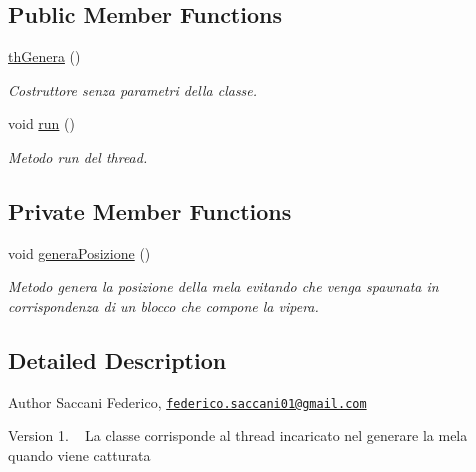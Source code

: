 \subsection*{Public Member Functions}
\begin{DoxyCompactItemize}
\item 
\mbox{\hyperlink{class_snake_1_1game_1_1threads_1_1th_genera_a0852ddb3ed4a55dcae45599d6ae3ebca}{th\+Genera}} ()
\begin{DoxyCompactList}\small\item\em Costruttore senza parametri della classe. \end{DoxyCompactList}\item 
void \mbox{\hyperlink{class_snake_1_1game_1_1threads_1_1th_genera_a13a43e6d814de94978c515cb084873b1}{run}} ()
\begin{DoxyCompactList}\small\item\em Metodo run del thread. \end{DoxyCompactList}\end{DoxyCompactItemize}
\subsection*{Private Member Functions}
\begin{DoxyCompactItemize}
\item 
void \mbox{\hyperlink{class_snake_1_1game_1_1threads_1_1th_genera_a3d74cc6ca0a52476e34eefbf570fa492}{genera\+Posizione}} ()
\begin{DoxyCompactList}\small\item\em Metodo genera la posizione della mela evitando che venga spawnata in corrispondenza di un blocco che compone la vipera. \end{DoxyCompactList}\end{DoxyCompactItemize}


\subsection{Detailed Description}
\begin{DoxyAuthor}{Author}
Saccani Federico, \href{mailto:federico.saccani01@gmail.com}{\tt federico.\+saccani01@gmail.\+com} 
\end{DoxyAuthor}
\begin{DoxyVersion}{Version}
1. ~\newline
La classe corrisponde al thread incaricato nel generare la mela quando viene catturata 
\end{DoxyVersion}


